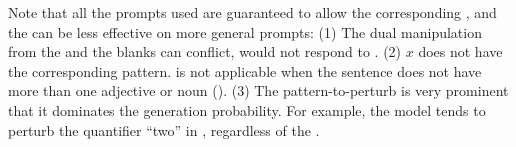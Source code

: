 Note that all the prompts used are guaranteed to allow the corresponding \tagstrs, and the \tagstrshorts can be less effective on more general prompts:
(1) The dual manipulation from the \tagstrs and the blanks can conflict, \eg {} would not respond to .
(2) $x$ does not have the corresponding pattern.  is not applicable when the sentence does not have more than one adjective or noun (\eg {}).
(3) The pattern-to-perturb is very prominent that it dominates the generation probability. 
For example, the model tends to perturb the quantifier ``two'' in , regardless of the \tagstrshort.





